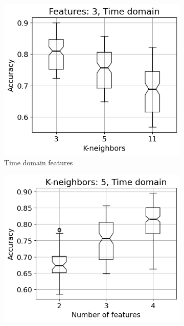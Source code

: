 \begin{figure}[h]
    \centering
    \begin{subfigure}[b]{0.48\textwidth}
        \includegraphics[width=\textwidth]{assets/results/feature-combinations/TD-3-A-False-False-F3.png}
        \caption{Time domain features}
    \end{subfigure}
    \hfill
    \begin{subfigure}[b]{0.48\textwidth}
        \includegraphics[width=\textwidth]{assets/results/feature-combinations/TD-3-A-False-False-K5.png}

\end{subfigure}
\end{figure}
